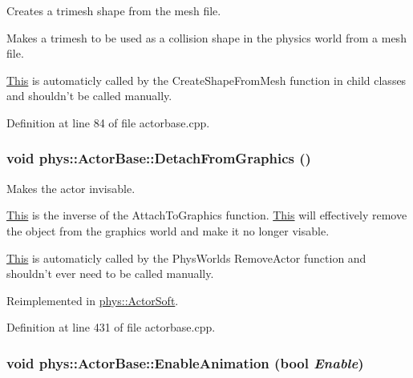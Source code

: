 Creates a trimesh shape from the mesh file. 

Makes a trimesh to be used as a collision shape in the physics world from a mesh file. \par
 \hyperlink{structThis}{This} is automaticly called by the CreateShapeFromMesh function in child classes and shouldn't be called manually. 

Definition at line 84 of file actorbase.cpp.

\hypertarget{classphys_1_1ActorBase_acc352d14b6d7f15694ea108ec1c281ec}{
\subsubsection[{DetachFromGraphics}]{\setlength{\rightskip}{0pt plus 5cm}void phys::ActorBase::DetachFromGraphics ()}}
\label{d8/d0f/classphys_1_1ActorBase_acc352d14b6d7f15694ea108ec1c281ec}


Makes the actor invisable. 

\hyperlink{structThis}{This} is the inverse of the AttachToGraphics function. \hyperlink{structThis}{This} will effectively remove the object from the graphics world and make it no longer visable. \par
 \hyperlink{structThis}{This} is automaticly called by the PhysWorlds RemoveActor function and shouldn't ever need to be called manually. 

Reimplemented in \hyperlink{classphys_1_1ActorSoft_a568b070c746775b73a3aa8ab33d6cc58}{phys::ActorSoft}.



Definition at line 431 of file actorbase.cpp.

\hypertarget{classphys_1_1ActorBase_a72203a9c7befd1ab606ff69af4183849}{
\subsubsection[{EnableAnimation}]{\setlength{\rightskip}{0pt plus 5cm}void phys::ActorBase::EnableAnimation (bool {\em Enable})}}
\label{d8/d0f/classphys_1_1ActorBase_a72203a9c7befd1ab606ff69af4183849}


